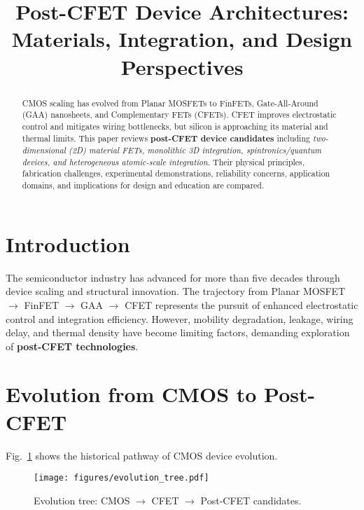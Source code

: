 \documentclass[conference]{IEEEtran}
\title{Post-CFET Device Architectures: Materials, Integration, and Design Perspectives}
\author{
\IEEEauthorblockN{Shinichi Samizo}
\IEEEauthorblockA{Independent Semiconductor Researcher\\
Project Design Hub, Samizo-AITL\\
\textit{Email:} \href{mailto:shin3t72@gmail.com}{shin3t72@gmail.com}\\
\textit{GitHub:} \href{https://github.com/Samizo-AITL}{Samizo-AITL}}
}
\begin{document}
\maketitle

\begin{abstract}
CMOS scaling has evolved from Planar MOSFETs to FinFETs, Gate-All-Around (GAA) nanosheets, and Complementary FETs (CFETs). CFET improves electrostatic control and mitigates wiring bottlenecks, but silicon is approaching its material and thermal limits. This paper reviews \textbf{post-CFET device candidates} including \textit{two-dimensional (2D) material FETs, monolithic 3D integration, spintronics/quantum devices, and heterogeneous atomic-scale integration}. Their physical principles, fabrication challenges, experimental demonstrations, reliability concerns, application domains, and implications for design and education are compared.
\end{abstract}

\section{Introduction}
The semiconductor industry has advanced for more than five decades through device scaling and structural innovation. 
The trajectory from Planar MOSFET $\to$ FinFET $\to$ GAA $\to$ CFET represents the pursuit of enhanced electrostatic control and integration efficiency.  
However, mobility degradation, leakage, wiring delay, and thermal density have become limiting factors, demanding exploration of \textbf{post-CFET technologies}.

\section{Evolution from CMOS to Post-CFET}
Fig.~\ref{fig:evolution} shows the historical pathway of CMOS device evolution.

\begin{figure}[ht]
  \centering
  \texttt{[image: figures/evolution\_tree.pdf]}
  \caption{Evolution tree: CMOS $\to$ CFET $\to$ Post-CFET candidates.}
  \label{fig:evolution}
\end{figure}
\end{document}
